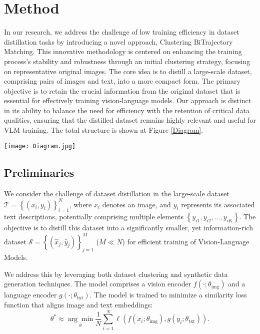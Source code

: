 \documentclass[sigconf, nonacm]{acmart}
\begin{document}
\section{Method}
In our research, we address the challenge of low training efficiency in dataset distillation tasks by introducing a novel approach, Clustering BiTrajectory Matching. This innovative methodology is centered on enhancing the training process's stability and robustness through an initial clustering strategy, focusing on representative original images. The core idea is to distill a large-scale dataset, comprising pairs of images and text, into a more compact form. The primary objective is to retain the crucial information from the original dataset that is essential for effectively training vision-language models. Our approach is distinct in its ability to balance the need for efficiency with the retention of critical data qualities, ensuring that the distilled dataset remains highly relevant and useful for VLM training. The total structure is shown at Figure \ref{Diagram}.

\begin{figure*}[ht]
\centering
\texttt{[image: Diagram.jpg]} 
\caption{Structure of Clustering BiTrajectory Matching}
\label{Diagram}
\end{figure*}

\subsection{Preliminaries}
We consider the challenge of dataset distillation in the large-scale dataset $\mathcal{T}=\left\{\left(x_i, y_i\right)\right\}_{i=1}^N$, where $x_i$ denotes an image, and $y_i$ represents its associated text descriptions, potentially comprising multiple elements $\left\{y_{i1}, y_{i2}, \ldots, y_{iK}\right\}$. The objective is to distill this dataset into a significantly smaller, yet information-rich dataset ${\mathcal{S}}=\left\{\left(\hat{x}_j, \hat{y}_j\right)\right\}_{j=1}^M$ ($M \ll N$) for efficient training of Vision-Language Models.

We address this by leveraging both dataset clustering and synthetic data generation techniques. The model comprises a vision encoder $f\left(\cdot ; \theta_{\text{img}}\right)$ and a language encoder $g\left(\cdot ; \theta_{\text{txt}}\right)$. The model is trained to minimize a similarity loss function that aligns image and text embeddings:
\begin{equation}
\theta^* \approx \underset{\theta}{\arg \min } \frac{1}{N} \sum_{i=1}^N \ell\left(f\left(x_i ; \theta_{\text{img}}\right), g\left(y_i ; \theta_{\text{txt}}\right)\right).
\end{equation}
\end{document}
